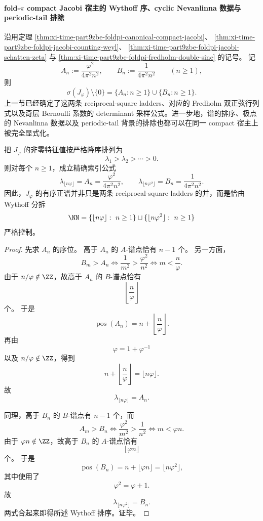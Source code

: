 \paragraph{fold-\texorpdfstring{$\pi$}{pi} compact Jacobi 宿主的 Wythoff 序、cyclic Nevanlinna 数据与 periodic-tail 排除}
沿用定理 \ref{thm:xi-time-part9zbe-foldpi-canonical-compact-jacobi}、
\ref{thm:xi-time-part9zbe-foldpi-jacobi-counting-weyl}、
\ref{thm:xi-time-part9zbe-foldpi-jacobi-schatten-zeta}
与 \ref{thm:xi-time-part9zbe-foldpi-fredholm-double-sine} 的记号。
记
\[
A_n:=\frac{\varphi^2}{4\pi^2n^2},
\qquad
B_n:=\frac{1}{4\pi^2n^2}
\qquad (n\ge 1),
\]
则
\[
\sigma(J_\varphi)\setminus\{0\}=\{A_n:n\ge 1\}\cup\{B_n:n\ge 1\}.
\]
上一节已经确定了这两条 reciprocal-square ladders、对应的 Fredholm 双正弦行列式以及奇层 Bernoulli 系数的 determinant 采样公式。进一步地，谱的排序、极点的 Nevanlinna 数据以及 periodic-tail 背景的排除也都可以在同一 compact 宿主上被完全显式化。

\begin{theorem}\label{thm:xi-time-part9zbf-foldpi-wythoff-spectral-order}
把 \(J_\varphi\) 的非零特征值按严格降序排列为
\[
\lambda_1>\lambda_2>\cdots>0.
\]
则对每个 \(n\ge 1\)，成立精确索引公式
\[
\lambda_{\lfloor n\varphi\rfloor}=A_n=\frac{\varphi^2}{4\pi^2n^2},
\qquad
\lambda_{\lfloor n\varphi^2\rfloor}=B_n=\frac{1}{4\pi^2n^2}.
\]
因此，\(J_\varphi\) 的有序正谱并非只是两条 reciprocal-square ladders 的并，而是恰由 Wythoff 分拆
\[
\NN
=
\{\lfloor n\varphi\rfloor:\ n\ge 1\}
\sqcup
\{\lfloor n\varphi^2\rfloor:\ n\ge 1\}
\]
严格控制。
\end{theorem}
\begin{proof}
先求 \(A_n\) 的序位。
高于 \(A_n\) 的 \(A\)-谱点恰有 \(n-1\) 个。
另一方面，
\[
B_m>A_n
\iff
\frac{1}{m^2}>\frac{\varphi^2}{n^2}
\iff
m<\frac{n}{\varphi}.
\]
由于 \(n/\varphi\notin\ZZ\)，故高于 \(A_n\) 的 \(B\)-谱点恰有
\[
\left\lfloor \frac{n}{\varphi}\right\rfloor
\]
个。
于是
\[
\operatorname{pos}(A_n)
=
n+\left\lfloor \frac{n}{\varphi}\right\rfloor.
\]
再由
\[
\varphi=1+\varphi^{-1}
\]
以及 \(n/\varphi\notin\ZZ\)，得到
\[
n+\left\lfloor \frac{n}{\varphi}\right\rfloor
=
\lfloor n\varphi\rfloor.
\]
故
\[
\lambda_{\lfloor n\varphi\rfloor}=A_n.
\]

同理，高于 \(B_n\) 的 \(B\)-谱点有 \(n-1\) 个，而
\[
A_m>B_n
\iff
\frac{\varphi^2}{m^2}>\frac{1}{n^2}
\iff
m<\varphi n.
\]
由于 \(\varphi n\notin\ZZ\)，故高于 \(B_n\) 的 \(A\)-谱点恰有
\[
\lfloor \varphi n\rfloor
\]
个。
于是
\[
\operatorname{pos}(B_n)
=
n+\lfloor \varphi n\rfloor
=
\lfloor n\varphi^2\rfloor,
\]
其中使用了
\[
\varphi^2=\varphi+1.
\]
故
\[
\lambda_{\lfloor n\varphi^2\rfloor}=B_n.
\]
两式合起来即得所述 Wythoff 排序。证毕。
\end{proof}

